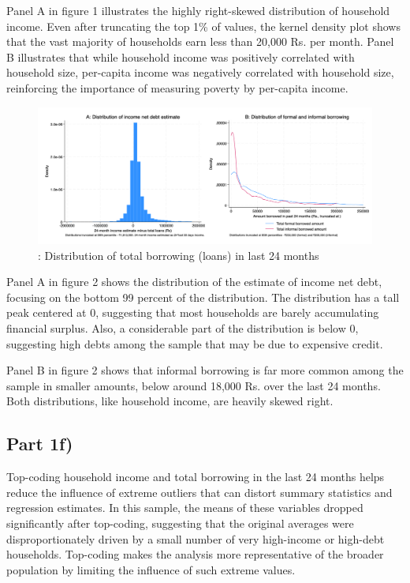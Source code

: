 \documentclass[12pt]{article}
\begin{document}
Panel A in figure 1 illustrates the highly right-skewed distribution of household income. Even after truncating the top 1\% of values, the kernel density plot shows that the vast majority of households earn less than 20,000 Rs. per month. Panel B illustrates that while household income was positively correlated with household size, per-capita income was negatively correlated with household size, reinforcing the importance of measuring poverty by per-capita income.


\begin{landscape}
    


\begin{figure}[H]
    \centering
    \includegraphics[width=\textwidth]{figures/figure02_loandistribution.png}
    \caption{: Distribution of total borrowing (loans) in last 24 months}
\end{figure}

Panel A in figure 2 shows the distribution of the estimate of income net debt, focusing on the bottom 99 percent of the distribution. The distribution has a tall peak centered at 0, suggesting that most households are barely accumulating financial surplus. Also, a considerable part of the distribution is below 0, suggesting high debts among the sample that may be due to expensive credit. 

Panel B in figure 2 shows that informal borrowing is far more common among the sample in smaller amounts, below around 18,000 Rs. over the last 24 months. Both distributions, like household income, are heavily skewed right. 
\end{landscape}

\subsection*{Part 1f)}

Top-coding household income and total borrowing in the last 24 months helps reduce the influence of extreme outliers that can distort summary statistics and regression estimates. In this sample, the means of these variables dropped significantly after top-coding, suggesting that the original averages were disproportionately driven by a small number of very high-income or high-debt households. Top-coding makes the analysis more representative of the broader population by limiting the influence of such extreme values.
\end{document}
